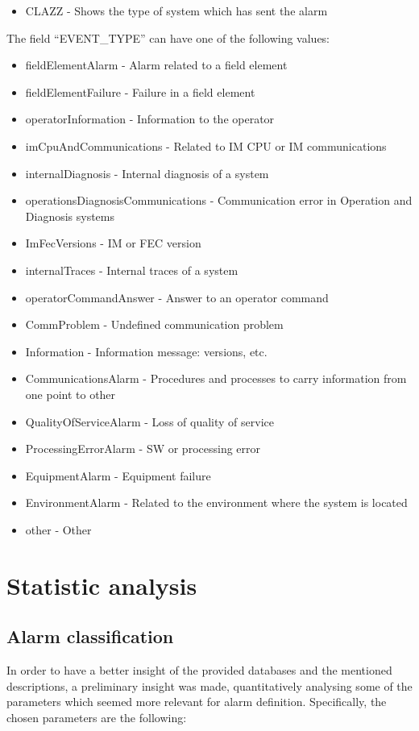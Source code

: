 \documentclass[a4paper,10pt]{report}
\begin{document}
\begin{itemize}
 \item CLAZZ - Shows the type of system which has sent the alarm
\end{itemize}
The field ``EVENT\_TYPE'' can have one of the following values:
\begin{itemize}
  \item fieldElementAlarm - Alarm related to a field element
  \item fieldElementFailure - Failure in a field element
  \item operatorInformation - Information to the operator
  \item imCpuAndCommunications - Related to IM CPU or IM communications
  \item internalDiagnosis - Internal diagnosis of a system
  \item operationsDiagnosisCommunications - Communication error in Operation and Diagnosis systems
  \item ImFecVersions - IM or FEC version
  \item internalTraces - Internal traces of a system
  \item operatorCommandAnswer - Answer to an operator command
  \item CommProblem - Undefined communication problem
  \item Information - Information message: versions, etc.
  \item CommunicationsAlarm - Procedures and processes to carry information from one point to other
  \item QualityOfServiceAlarm - Loss of quality of service
  \item ProcessingErrorAlarm - SW or processing error
  \item EquipmentAlarm - Equipment failure
  \item EnvironmentAlarm - Related to the environment where the system is located
  \item other - Other
\end{itemize}

\section{Statistic analysis}
\subsection{Alarm classification}
In order to have a better insight of the provided databases and the mentioned descriptions, a preliminary insight was made, quantitatively analysing some of the parameters which seemed more relevant for alarm definition. Specifically, the chosen parameters are the following:
\end{document}
